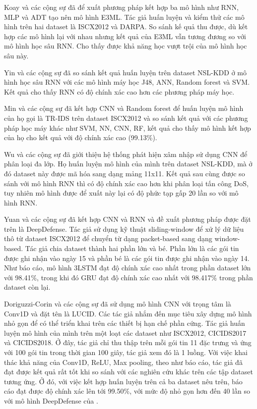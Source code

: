 Koay và các cộng sự \cite{47-Koay} đã để xuất phương pháp kết hợp ba mô hình như RNN, MLP và ADT tạo nên mô hình E3ML. Tác giả huấn luyện và kiểm thử các mô hình trên hai dataset là ISCX2012 và DARPA. So sánh kế quả thu được, dù kết hợp các mô hình lại với nhau nhưng kết quả của E3ML vẫn tương đương so với mô hình học sâu RNN. Cho thấy được khả năng học vượt trội của mô hình học sâu này.

Yin và các cộng sự \cite{48-Yin} đã so sánh kết quả huấn luyện trên dataset NSL-KDD ở mô hình học sâu RNN với các mô hình máy học J48, ANN, Random forest và SVM. Kết quả cho thấy RNN có độ chính xác cao hơn các phương pháp máy học. 

Min và các cộng sự \cite{49-Min} đã kết hợp CNN và Random forest  để huấn luyện mô hình của họ gọi là TR-IDS trên dataset ISCX2012 và so sánh kết quả với các phương pháp học máy khác như SVM, NN, CNN, RF, kết quả cho thấy mô hình kết hợp của họ cho kết quả với độ chính xác cao (99.13\%).

Wu và các cộng sự \cite{50-Wu} đã giới thiệu hệ thống phát hiện xâm nhập sử dụng CNN để phân loại đa lớp. Họ huấn luyện mô hình của mình trên dataset NSL-KDD, mà ở đó dataset này được mã hóa sang dạng mảng 11x11. Kết quả sau cùng được so sánh với mô hình RNN thì có độ chính xác cao hơn khi phân loại tấn công DoS, tuy nhiên mô hình được để xuất này lại có độ phức tạp gấp 20 lần so với mô hình RNN.

Yuan và các cộng sự \cite{28-Yuan} đã kết hợp CNN và RNN và đề xuất phương pháp được đặt trên là DeepDefense. Tác giả sử dụng kỹ thuật sliding-window để xử lý dữ liệu thô từ dataset ISCX2012 để chuyển từ dạng packet-based sang dạng window-based. Tác giả chia dataset thành hai phần lớn và bé. Phần lớn là các gói tin được ghi nhận vào ngày 15 và phần bé là các gói tin được ghi nhận vào ngày 14. Như báo cáo, mô hình 3LSTM đạt độ chính xác cao nhất trong phần dataset lớn với 98.41\%, trong khi đó GRU đạt độ chính xác cao nhất với 98.417\% trong phần dataset còn lại.

Doriguzzi-Corin và các cộng sự \cite{27-Corin} đã sử dụng mô hình CNN với trọng tâm là Conv1D và đặt tên là LUCID. Các tác giả nhắm đến mục tiêu xây dựng mô hình nhỏ gọn để có thể triển khai trên các thiết bị hạn chế phần cứng. Tác giả huấn luyện mô hình của mình trên một loạt các dataset như ISCX2012, CICIDS2017 và CICIDS2018. Ở đây, tác giả chỉ thu thập trên mỗi gói tin 11 đặc trưng và ứng với 100 gói tin trong thời gian 100 giây, tác giả xem đó là 1 luồng. Với việc khai thác khả năng của Conv1D, ReLU, Max pooling, theo như báo cáo, tác giả đã đạt được kết quả rất tốt khi so sánh với các nghiên cứu khác trên các tập dataset tương ứng. Ở đó, với việc kết hợp huấn luyện trên cả ba dataset nêu trên, báo cáo đạt được độ chính xác lên tới 99.50\%, với mức độ nhỏ gọn hơn đến 40 lần so với mô hình DeepDefense của \cite{28-Yuan}.

